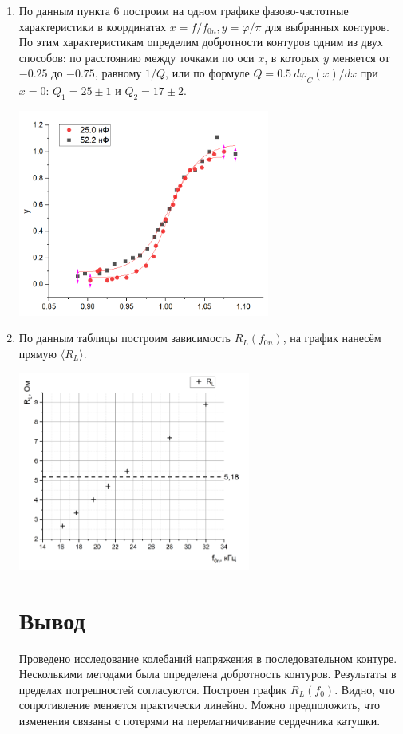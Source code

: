 \documentclass[a4paper,12pt]{article}
\begin{document}
\begin{enumerate}
\begin{center}
\end{center}
\item По данным пункта 6 построим на одном графике фазово-частотные характеристики в координатах $x = f/f_{0n}, y = \varphi /\pi$ для выбранных контуров. По этим характеристикам определим добротности контуров одним из двух способов: по расстоянию между
точками по оси $x$, в которых $y$ меняется от $-0.25$ до $-0.75$, равному $1/Q$, или по формуле $Q = 0.5~d\varphi_C(x)/dx$ при $x=0$: $Q_1 = 25 \pm 1$ и $Q_2 = 17 \pm 2$.
\begin{center}
\includegraphics[width = 0.65\textwidth]{4.png}
\end{center}
\item По данным таблицы построим зависимость $R_L(f_{0n})$, на график нанесём прямую $\langle R_L \rangle$.
\begin{center}
\includegraphics[width = 0.6\textwidth]{5.png}
\end{center}
\section{Вывод}
Проведено исследование колебаний напряжения в последовательном контуре. Несколькими методами была определена добротность контуров. Результаты в пределах погрешностей согласуются. Построен график $ R_L (f_0) $. Видно, что сопротивление меняется практически линейно. Можно предположить, что изменения связаны с потерями на перемагничивание сердечника катушки. 

 
\end{enumerate}
\end{document}
